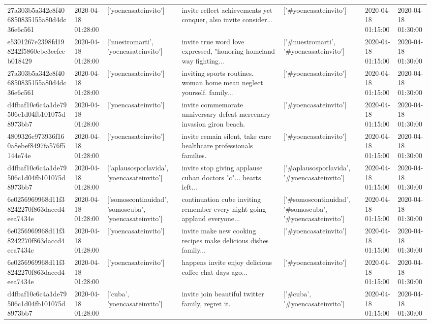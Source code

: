 \begin{tabular}{lllllll}
27a303b5a342e8f406850835155a80d4dc36e6c561 & 2020-04-18 01:28:00 & ['yoencasateinvito'] & invite reflect achievements yet conquer, also invite consider... & ['#yoencasateinvito'] & 2020-04-18 01:15:00 & 2020-04-18 01:30:00 \\
e5301267e2398fd198242f5860cbc3ecfceb018429 & 2020-04-18 01:28:00 & ['nuestromarti', 'yoencasateinvito'] & invite true word love expressed, "honoring homeland way fighting... & ['#nuestromarti', '#yoencasateinvito'] & 2020-04-18 01:15:00 & 2020-04-18 01:30:00 \\
27a303b5a342e8f406850835155a80d4dc36e6c561 & 2020-04-18 01:28:00 & ['yoencasateinvito'] & inviting sports routines. woman home mean neglect yourself. family... & ['#yoencasateinvito'] & 2020-04-18 01:15:00 & 2020-04-18 01:30:00 \\
d4fbaf10c6c4a1de79506c1d04fb101075d8973bb7 & 2020-04-18 01:28:00 & ['yoencasateinvito'] & invite commemorate anniversary defeat mercenary invasion giron beach. & ['#yoencasateinvito'] & 2020-04-18 01:15:00 & 2020-04-18 01:30:00 \\
4809326c973936f160a8ebef8497fa576f5144e74e & 2020-04-18 01:28:00 & ['yoencasateinvito'] & invite remain silent, take care healthcare professionals families. & ['#yoencasateinvito'] & 2020-04-18 01:15:00 & 2020-04-18 01:30:00 \\
d4fbaf10c6c4a1de79506c1d04fb101075d8973bb7 & 2020-04-18 01:28:00 & ['aplausosporlavida', 'yoencasateinvito'] & invite stop giving applause cuban doctors "c"... hearts left... & ['#aplausosporlavida', '#yoencasateinvito'] & 2020-04-18 01:15:00 & 2020-04-18 01:30:00 \\
6e0256969968d11f38242270f863daccd4eea7434e & 2020-04-18 01:28:00 & ['somoscontinuidad', 'somoscuba', 'yoencasateinvito'] & continuation cube inviting remember every night going applaud everyone... & ['#somoscontinuidad', '#somoscuba', '#yoencasateinvito'] & 2020-04-18 01:15:00 & 2020-04-18 01:30:00 \\
6e0256969968d11f38242270f863daccd4eea7434e & 2020-04-18 01:28:00 & ['yoencasateinvito'] & invite make new cooking recipes make delicious dishes family... & ['#yoencasateinvito'] & 2020-04-18 01:15:00 & 2020-04-18 01:30:00 \\
6e0256969968d11f38242270f863daccd4eea7434e & 2020-04-18 01:28:00 & ['yoencasateinvito'] & happens invite enjoy delicious coffee chat days ago... & ['#yoencasateinvito'] & 2020-04-18 01:15:00 & 2020-04-18 01:30:00 \\
d4fbaf10c6c4a1de79506c1d04fb101075d8973bb7 & 2020-04-18 01:28:00 & ['cuba', 'yoencasateinvito'] & invite join beautiful twitter family, regret it. & ['#cuba', '#yoencasateinvito'] & 2020-04-18 01:15:00 & 2020-04-18 01:30:00 \\

\end{tabular}
